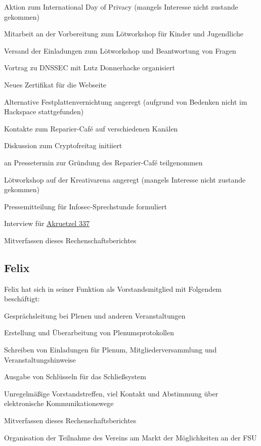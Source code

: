 \documentclass[ngerman]{scrartcl}
\begin{document}
\begin{compactitem}
\item Aktion zum International Day of Privacy (mangels Interesse nicht
  zustande gekommen)
\item Mitarbeit an der Vorbereitung zum Lötworkshop für Kinder und
  Jugendliche
\item Versand der Einladungen zum Lötworkshop und Beantwortung von
  Fragen
\item Vortrag zu DNSSEC mit Lutz Donnerhacke organisiert
\item Neues Zertifikat für die Webseite
\item Alternative Festplattenvernichtung angeregt (aufgrund von
  Bedenken nicht im Hackspace stattgefunden)
\item Kontakte zum Reparier-Café auf verschiedenen Kanälen
\item Diskussion zum Cryptofreitag initiiert
\item an Pressetermin zur Gründung des Reparier-Café teilgenommen
\item Lötworkshop auf der Kreativarena angeregt (mangels Interesse
  nicht zustande gekommen)
\item Pressemitteilung für Infosec-Sprechstunde formuliert
\item Interview für \href{https://www.akruetzel.de/wp-content/uploads/337-Finale-Version.pdf}{Akruetzel 337}
    \item Mitverfassen dieses Rechenschaftsberichtes
\end{compactitem}

\subsection{Felix}

Felix hat sich in seiner Funktion als Vorstandsmitglied mit Folgendem 
beschäftigt:

\begin{compactitem}
    \item Gesprächsleitung bei Plenen und anderen Veranstaltungen
    \item Erstellung und Überarbeitung von Plenumsprotokollen
    \item Schreiben von Einladungen für Plenum, Mitgliederversammlung und 
        Veranstaltungshinweise
    \item Ausgabe von Schlüsseln für das Schließsystem
    \item Unregelmäßige Vorstandstreffen, viel Kontakt und Abstimmung über 
        elektronische Kommunikationswege
    \item Mitverfassen dieses Rechenschaftsberichtes
    \item Organisation der Teilnahme des Vereins am Markt der Möglichkeiten an der FSU
\end{compactitem}
\end{document}
